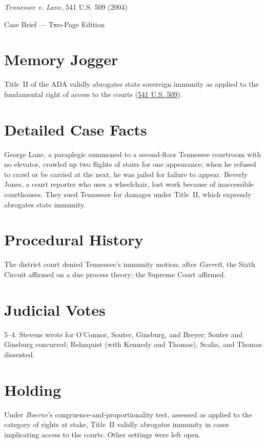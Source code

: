 \documentclass[12pt]{article}
\begin{document}
\begin{center}
{\LARGE \textit{Tennessee v. Lane}, 541 U.S. 509 (2004)\par}
\vspace{0.5em}
{\large Case Brief --- Two-Page Edition\par}
\end{center}

\section{Memory Jogger}
Title~II of the ADA validly abrogates state sovereign immunity as applied to the fundamental right of access to the courts (\href{https://www.law.cornell.edu/supremecourt/text/541/509}{541 U.S. 509}).

\section{Detailed Case Facts}
George Lane, a paraplegic summoned to a second-floor Tennessee courtroom with no elevator, crawled up two flights of stairs for one appearance; when he refused to crawl or be carried at the next, he was jailed for failure to appear. Beverly Jones, a court reporter who uses a wheelchair, lost work because of inaccessible courthouses. They sued Tennessee for damages under Title~II, which expressly abrogates state immunity.

\section{Procedural History}
The district court denied Tennessee's immunity motion; after \textit{Garrett}, the Sixth Circuit affirmed on a due process theory; the Supreme Court affirmed.

\section{Judicial Votes}
5--4. Stevens wrote for O'Connor, Souter, Ginsburg, and Breyer; Souter and Ginsburg concurred; Rehnquist (with Kennedy and Thomas), Scalia, and Thomas dissented.

\section{Holding}
Under \textit{Boerne}'s congruence-and-proportionality test, assessed as applied to the category of rights at stake, Title~II validly abrogates immunity in cases implicating access to the courts. Other settings were left open.
\end{document}
